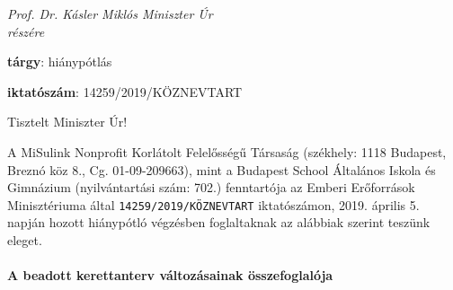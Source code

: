\pagestyle{empty}

\noindent
\textit{Prof. Dr. Kásler Miklós Miniszter Úr \\
      részére}
\vspace{0.75cm}

\noindent
\textbf{tárgy}: hiánypótlás

\noindent
\textbf{iktatószám}: 14259/2019/KÖZNEVTART
\vspace{0.75cm}

\noindent
Tisztelt Miniszter Úr!
\vspace{0.75cm}

\noindent
A MiSulink Nonprofit Korlátolt Felelősségű Társaság (székhely: 1118 Budapest,
Breznó köz 8., Cg. 01-09-209663), mint a Budapest School Általános Iskola és
Gimnázium (nyilvántartási szám: 702.) fenntartója az Emberi Erőforrások
Minisztériuma által {\tt 14259/2019/KÖZNEVTART} iktatószámon, 2019. április 5.
napján
hozott hiánypótló végzésben foglaltaknak az alábbiak szerint teszünk eleget.

\paragraph{A beadott kerettanterv változásainak összefoglalója}

